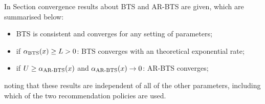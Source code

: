         In Section  convergence results about BTS and AR-BTS are given, which are summarised below:
        \begin{itemize}
            \item BTS is consistent and converges for any setting of parameters;
            \item if ${\alpha_{{\textnormal{BTS}}}}(x) \geq L > 0$: BTS converges with an theoretical exponential rate;
            \item if $U \geq {\alpha_{{\textnormal{AR-BTS}}}}(x)$ and ${\alpha_{{\textnormal{AR-BTS}}}}(x) \rightarrow 0$: AR-BTS converges;
        \end{itemize}
        noting that these results are independent of all of the other parameters, including which of the two recommendation policies are used.

















